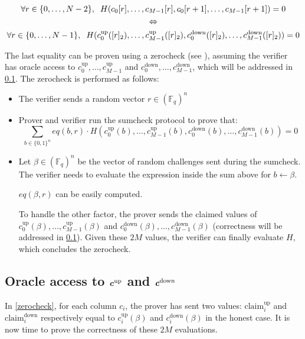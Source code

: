 \documentclass{article}
\newcommand{\Fq}{\mathbb F_q}
\begin{document}
$$\begin{gathered}
\forall r \in \{0, \dots, N-2\}, \hspace{2mm} H(c_0[r], \dots, c_{M-1}[r], c_0[r+1], \dots, c_{M-1}[r+1]) = 0 \\
\Leftrightarrow\\
\forall r \in \{0, \dots, N-1\}, \hspace{2mm} H(c_0^{\text{up}}([r]_2), \dots, c_{M-1}^{\text{up}}([r]_2), c_0^{\text{down}}([r]_2), \dots, c_{M-1}^{\text{down}}([r]_2)) = 0
\end{gathered}$$

The last equality can be proven using a zerocheck (see \cite{hyperplonk}), assuming the verifier has oracle access to $c_0^{\text{up}}, \dots, c_{M-1}^{\text{up}}$ and $ c_0^{\text{down}}, \dots, c_{M-1}^{\text{down}}$, which will be addressed in \ref{shifted_mle}. The zerocheck is performed as follows:

\begin{itemize}
    \item The verifier sends a random vector $r \in (\Fq)^n$
    \item Prover and verifier run the sumcheck protocol to prove that:
    $$ \sum_{b \in \{0, 1\}^n} eq(b, r) \cdot H(c_0^{\text{up}}(b), \dots, c_{M-1}^{\text{up}}(b), c_0^{\text{down}}(b), \dots, c_{M-1}^{\text{down}}(b)) = 0 $$
    \item Let $\beta \in (\Fq)^n$ be the vector of random challenges sent during the sumcheck. The verifier needs to evaluate the expression inside the sum above for $b \xleftarrow{} \beta$.
    
    $eq(\beta, r)$ can be easily computed.
    
    To handle the other factor, the prover sends the claimed values of $c_0^{\text{up}}(\beta), \dots, c_{M-1}^{\text{up}}(\beta)$ and $c_0^{\text{down}}(\beta), \dots, c_{M-1}^{\text{down}}(\beta)$ (correctness will be addressed in \ref{shifted_mle}). Given these $2M$ values, the verifier can finally evaluate $H$, which concludes the zerocheck.
\end{itemize}

\subsection{Oracle access to \texorpdfstring{$\textbf{\textit{c}}^{\text{up}}$}{} and \texorpdfstring{$\textbf{\textit{c}}^{\text{down}}$}{}}\label{shifted_mle}

In \ref{zerocheck}, for each column $c_i$, the prover has sent two values: $\text{claim}^\text{up}_i$ and $\text{claim}^\text{down}_i$ respectively equal to $c_i^{\text{up}}(\beta)$ and $c_i^{\text{down}}(\beta)$ in the honest case. It is now time to prove the correctness of these $2M$ evaluations.
\end{document}
